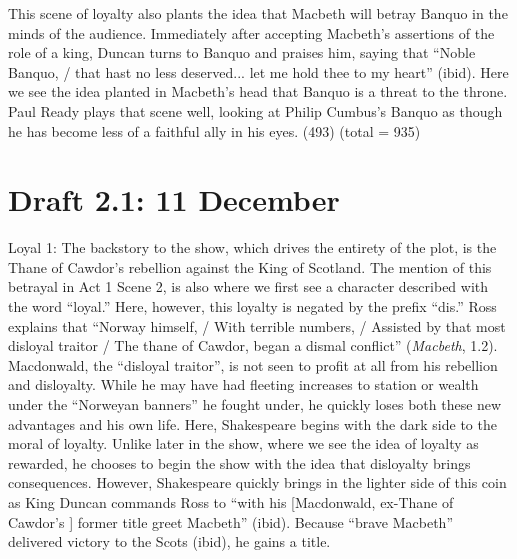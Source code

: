 \documentclass[12pt]{article}[titlepage]
\newcommand{\say}[1]{``#1''}
\newcommand{\1}{\={a}}
\newcommand{\2}{\={e}}
\newcommand{\3}{\={\i}}
\newcommand{\4}{\=o}
\newcommand{\5}{\=u}
\newcommand{\6}{\={A}}
\renewcommand{\,}{\textsuperscript{,}}
\begin{document}
This scene of loyalty also plants the idea that Macbeth will betray Banquo in the minds of the audience.
Immediately after accepting Macbeth's assertions of the role of a king, Duncan turns to Banquo and praises him, saying that \say{Noble Banquo, / that hast no less deserved... let me hold thee to my heart} (ibid).
Here we see the idea planted in Macbeth's head that Banquo is a threat to the throne.
Paul Ready plays that scene well, looking at Philip Cumbus's Banquo as though he has become less of a faithful ally in his eyes.
(493) (total = 935)
\section{Draft 2.1: 11 December}
Loyal 1:
The backstory to the show, which drives the entirety of the plot, is the Thane of Cawdor's rebellion against the King of Scotland.
The mention of this betrayal in Act 1 Scene 2, is also where we first see a character described with the word \say{loyal.}
Here, however, this loyalty is negated by the prefix \say{dis.}
Ross explains that \say{Norway himself, / With terrible numbers, / Assisted by that most disloyal traitor / The thane of Cawdor, began a dismal conflict} (\textit{Macbeth}, 1.2).
Macdonwald, the \say{disloyal traitor}, is not seen to profit at all from his rebellion and disloyalty.
While he may have had fleeting increases to station or wealth under the \say{Norweyan banners} he fought under, he quickly loses both these new advantages and his own life.
Here, Shakespeare begins with the dark side to the moral of loyalty.
Unlike later in the show, where we see the idea of loyalty as rewarded, he chooses to begin the show with the idea that disloyalty brings consequences.
However, Shakespeare quickly brings in the lighter side of this coin as King Duncan commands Ross to \say{with his [Macdonwald, ex-Thane of Cawdor's ] former title greet Macbeth} (ibid).
Because \say{brave Macbeth} delivered victory to the Scots (ibid), he gains a title.
\end{document}
